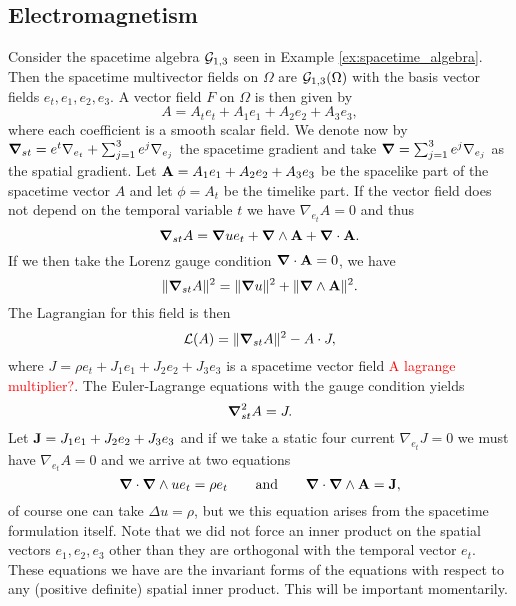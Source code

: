 

\subsection{Electromagnetism}

Consider the spacetime algebra $\mathcal{G}_{1,3}$ seen in Example \ref{ex:spacetime_algebra}. Then the spacetime multivector fields on $\Omega$ are $\mathcal{G}_{1,3}(\Omega)$ with the basis vector fields $e_t,e_1,e_2,e_3$.  A vector field $F$ on $\Omega$ is then given by
\[
A= A_t e_t + A_1 e_1 + A_2 e_2 + A_3 e_3,
\]
where each coefficient is a smooth scalar field. We denote now by $\boldsymbol{\nabla}_{st} = e^t \nabla_{e_t} + \sum_{j=1}^3 e^j \nabla_{e_j}$ the spacetime gradient and take $\boldsymbol{\nabla} = \sum_{j=1}^3 e^j \nabla_{e_j}$ as the spatial gradient. Let $\mathbf{A} = A_1 e_1 + A_2 e_2 + A_3 e_3$ be the spacelike part of the spacetime vector $A$ and let $\phi = A_t$ be the timelike part. If the vector field does not depend on the temporal variable $t$ we have $\nabla_{e_t} A=0$ and thus
\[
\boldsymbol{\nabla}_{st} A = \boldsymbol{\nabla} u e_t + \boldsymbol{\nabla} \wedge \mathbf{A} + \boldsymbol{\nabla} \cdot \mathbf{A}.
\]
If we then take the Lorenz gauge condition $\boldsymbol{\nabla} \cdot \mathbf{A} =0$, we have
\[
\|\boldsymbol{\nabla}_{st}A\|^2 = \| \boldsymbol{\nabla} u\|^2 + \|\boldsymbol{\nabla} \wedge \mathbf{A}\|^2.
\]
The Lagrangian for this field is then
\[
\mathcal{L}(A) = \|\boldsymbol{\nabla}_{st}A\|^2 - A \cdot J,
\]
where $J = \rho e_t + J_1 e_1 + J_2 e_2 + J_3 e_3$ is a spacetime vector field \textcolor{red}{A lagrange multiplier?}. The Euler-Lagrange equations with the gauge condition yields
\[
\boldsymbol{\nabla}_{st}^2 A = J.
\]
Let $\mathbf{J} = J_1 e_1 + J_2 e_2 + J_3 e_3$ and if we take a static four current $\nabla_{e_t} J=0$ we must have $\nabla_{e_t} A =0$ and we arrive at two equations
\[
\boldsymbol{\nabla} \cdot \boldsymbol{\nabla} \wedge u e_t = \rho e_t \qquad \textrm{and} \qquad \boldsymbol{\nabla} \cdot \boldsymbol{\nabla} \wedge \mathbf{A} = \mathbf{J}, 
\]
of course one can take $\Delta u = \rho$, but we this equation arises from the spacetime formulation itself. Note that we did not force an inner product on the spatial vectors $e_1,e_2,e_3$ other than they are orthogonal with the temporal vector $e_t$.  These equations we have are the invariant forms of the equations with respect to any (positive definite) spatial inner product. This will be important momentarily.

